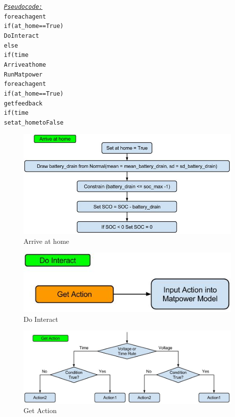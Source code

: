\documentclass[a4paper]{article}
\begin{document}
\begin{alltt}
 \underline{\textit{Pseudo code:}}
foreach agent
    if (at_home ==True)
        Do Interact
    else 
        if (time%
            Arrive at home
Run Matpower
foreach agent
    if (at_home == True)
        get feedback 
        if (time %
            set at_home to False
\end{alltt}
\newpage
\begin{figure}[!ht]
\includegraphics[width =\textwidth]{arrive_home.jpg}
\caption{Arrive at home}
\label{arrive_at_home}
\end{figure}

\begin{figure}[!ht]
\includegraphics[width =\textwidth]{do_interaction.jpg}
\caption{Do Interact}
\label{do_interact}
\end{figure}

\begin{figure}[!ht]
\includegraphics[width =\textwidth]{get_action.jpg}
\caption{Get Action}
\label{get_action}
\end{figure}
\end{document}
